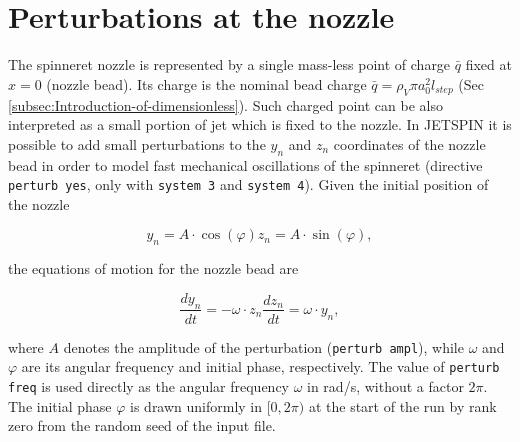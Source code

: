 
\section{Perturbations at the nozzle\label{sec:Perturbations-at-the}}

The spinneret nozzle is represented by a single mass-less point of
charge $\bar{q}$ fixed at $x=0$ (nozzle bead). Its charge is the
nominal bead charge $\bar{q}=\rho_{V}\pi a_{0}^{2}l_{step}$ (Sec
\ref{subsec:Introduction-of-dimensionless}). Such charged
point can be also interpreted as a small portion of jet which is fixed
to the nozzle. In JETSPIN it is possible to add small perturbations
to the $y_{n}$ and $z_{n}$ coordinates of the nozzle bead in order
to model fast mechanical oscillations of the spinneret\cite{coluzza2014ultrathin}
(directive \texttt{perturb yes}, only with \texttt{system 3} and
\texttt{system 4}).
Given the initial position of the nozzle

\begin{subequations}

\begin{equation}
y_{n}=A\cdot\cos\left(\varphi\right)
\end{equation}

\begin{equation}
z_{n}=A\cdot\sin\left(\varphi\right),
\end{equation}

\end{subequations}

the equations of motion for the nozzle bead are

\begin{subequations}

\begin{equation}
\frac{dy_{n}}{dt}=-\omega\cdot z_{n}
\end{equation}

\begin{equation}
\frac{dz_{n}}{dt}=\omega\cdot y_{n},
\end{equation}

\end{subequations}

where $A$ denotes the amplitude of the perturbation (\texttt{perturb ampl}),
while $\omega$ and $\varphi$ are its angular frequency and initial
phase, respectively. The value of \texttt{perturb freq} is used directly
as the angular frequency $\omega$ in rad/s, without a factor $2\pi$.
The initial phase $\varphi$ is drawn uniformly in $[0,2\pi)$ at the
start of the run by rank zero from the random seed of the input file.
